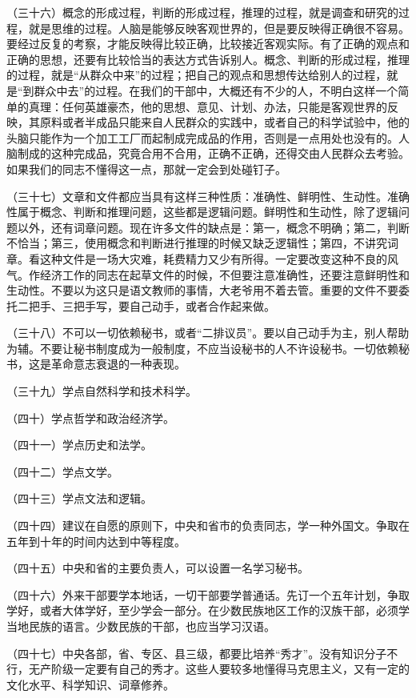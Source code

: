 （三十六）概念的形成过程，判断的形成过程，推理的过程，就是调查和研究的过程，就是思维的过程。人脑是能够反映客观世界的，但是要反映得正确很不容易。要经过反复的考察，才能反映得比较正确，比较接近客观实际。有了正确的观点和正确的思想，还要有比较恰当的表达方式告诉别人。概念、判断的形成过程，推理的过程，就是“从群众中来”的过程；把自己的观点和思想传达给别人的过程，就是“到群众中去”的过程。在我们的干部中，大概还有不少的人，不明白这样一个简单的真理：任何英雄豪杰，他的思想、意见、计划、办法，只能是客观世界的反映，其原料或者半成品只能来自人民群众的实践中，或者自己的科学试验中，他的头脑只能作为一个加工工厂而起制成完成品的作用，否则是一点用处也没有的。人脑制成的这种完成品，究竟合用不合用，正确不正确，还得交由人民群众去考验。如果我们的同志不懂得这一点，那就一定会到处碰钉子。

（三十七）文章和文件都应当具有这样三种性质：准确性、鲜明性、生动性。准确性属于概念、判断和推理问题，这些都是逻辑问题。鲜明性和生动性，除了逻辑问题以外，还有词章问题。现在许多文件的缺点是：第一，概念不明确；第二，判断不恰当；第三，使用概念和判断进行推理的时候又缺乏逻辑性；第四，不讲究词章。看这种文件是一场大灾难，耗费精力又少有所得。一定要改变这种不良的风气。作经济工作的同志在起草文件的时候，不但要注意准确性，还要注意鲜明性和生动性。不要以为这只是语文教师的事情，大老爷用不着去管。重要的文件不要委托二把手、三把手写，要自己动手，或者合作起来做。

（三十八）不可以一切依赖秘书，或者“二排议员”。要以自己动手为主，别人帮助为辅。不要让秘书制度成为一般制度，不应当设秘书的人不许设秘书。一切依赖秘书，这是革命意志衰退的一种表现。

（三十九）学点自然科学和技术科学。

（四十）学点哲学和政治经济学。

（四十一）学点历史和法学。

（四十二）学点文学。

（四十三）学点文法和逻辑。

（四十四）建议在自愿的原则下，中央和省市的负责同志，学一种外国文。争取在五年到十年的时间内达到中等程度。

（四十五）中央和省的主要负责人，可以设置一名学习秘书。

（四十六）外来干部要学本地话，一切干部要学普通话。先订一个五年计划，争取学好，或者大体学好，至少学会一部分。在少数民族地区工作的汉族干部，必须学当地民族的语言。少数民族的干部，也应当学习汉语。

（四十七）中央各部，省、专区、县三级，都要比培养“秀才”。没有知识分子不行，无产阶级一定要有自己的秀才。这些人要较多地懂得马克思主义，又有一定的文化水平、科学知识、词章修养。

